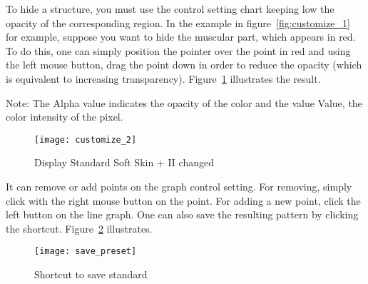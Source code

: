 \newpage



To hide a structure, you must use the control setting chart keeping low the opacity of the corresponding region. In the example in figure~\ref{fig:customize_1} for example, suppose you want to hide the muscular part, which appears in red. To do this, one can simply position the pointer over the point in red and using the left mouse button, drag the point down in order to reduce the opacity (which is equivalent to increasing transparency). Figure~\ref{fig:customize_2} illustrates the result.


Note: The Alpha value indicates the opacity of the color and the value Value, the color intensity of the pixel.

\begin{figure}[!htb]
\centering
\texttt{[image: customize\_2]}
\caption{Display Standard Soft Skin + II changed}
\label{fig:customize_2}
\end{figure}


\newpage



It can remove or add points on the graph control setting. For removing, simply click with the right mouse button on the point. For adding a new point, click the left button on the line
graph. One can also save the resulting pattern by clicking the shortcut.  Figure~\ref{fig:save_preset} illustrates.

\begin{figure}[!htb]
\centering
\texttt{[image: save\_preset]}
\caption{Shortcut to save standard}
\label{fig:save_preset}
\end{figure}
 
